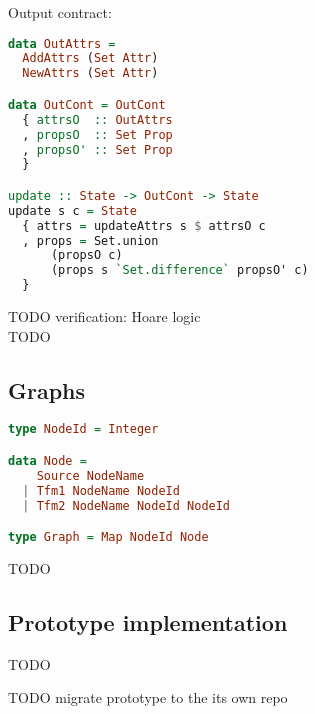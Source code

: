 Output contract:

\begin{lstlisting}[language=Haskell]
data OutAttrs =
  AddAttrs (Set Attr)
  NewAttrs (Set Attr)

data OutCont = OutCont
  { attrsO  :: OutAttrs
  , propsO  :: Set Prop
  , propsO' :: Set Prop
  }

update :: State -> OutCont -> State
update s c = State
  { attrs = updateAttrs s $ attrsO c
  , props = Set.union
      (propsO c)
      (props s `Set.difference` propsO' c)
  }
\end{lstlisting}

TODO verification: Hoare logic \\
TODO

\subsection{Graphs}

\begin{lstlisting}[language=Haskell]
type NodeId = Integer

data Node =
    Source NodeName
  | Tfm1 NodeName NodeId
  | Tfm2 NodeName NodeId NodeId

type Graph = Map NodeId Node
\end{lstlisting}

TODO

\subsection{Prototype implementation}

TODO

TODO migrate prototype to the its own repo
